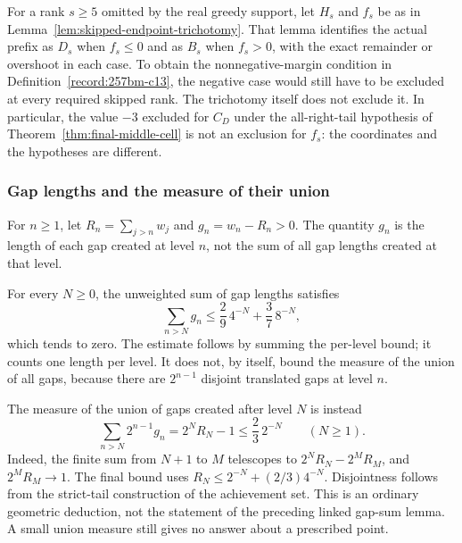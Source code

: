 \begin{thm}\label{record:257hg-i7}
For a rank $s\ge5$ omitted by the real greedy support, let $H_s$
and $f_s$ be as in Lemma~\ref{lem:skipped-endpoint-trichotomy}.
That lemma identifies the actual prefix as $D_s$ when $f_s\le0$
and as $B_s$ when $f_s>0$, with the exact remainder or overshoot
in each case.  To obtain the nonnegative-margin condition in
Definition~\ref{record:257bm-c13}, the negative case would still have
to be excluded at every required skipped rank.  The trichotomy
itself does not exclude it.  In particular, the value $-3$
excluded for $C_D$ under the all-right-tail hypothesis of
Theorem~\ref{thm:final-middle-cell} is not an exclusion for $f_s$:
the coordinates and the hypotheses are different.
\end{thm}

\subsubsection*{Gap lengths and the measure of their union}

\begin{defn}\label{record:257hg-i1}
For $n\ge1$, let $R_n=\sum_{j>n}w_j$ and $g_n=w_n-R_n>0$.
The quantity $g_n$ is the length of each gap created at level $n$, not
the sum of all gap lengths created at that level.
\par\noindent   {} 
\end{defn}

\begin{thm}\label{record:257hg-i2}
For every $N\ge0$, the unweighted sum of gap lengths satisfies
\[
 \sum_{n>N}g_n\le\frac29\,4^{-N}+\frac37\,8^{-N},
\]
which tends to zero.  The estimate follows by summing the per-level
bound; it counts one length per level.  It does not, by itself, bound
the measure of the union of all gaps, because there are $2^{n-1}$
disjoint translated gaps at level $n$.
\end{thm}

The measure of the union of gaps created after level $N$ is instead
\[
 \sum_{n>N}2^{n-1}g_n=2^N R_N-1
 \le\frac23\,2^{-N}\qquad(N\ge1).
\]
Indeed, the finite sum from $N+1$ to $M$ telescopes to
$2^N R_N-2^M R_M$, and $2^M R_M\to1$.  The final bound uses
$R_N\le2^{-N}+(2/3)4^{-N}$.  Disjointness follows from the strict-tail
construction of the achievement set.  This is an ordinary geometric
deduction, not the statement of the preceding linked gap-sum lemma.
A small union measure still gives no answer about a prescribed point.

